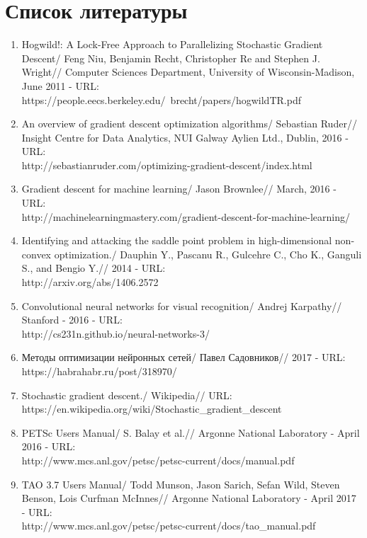 \documentclass[12pt]{report}
\begin{document}
  \chapter{Список литературы}
  \begin{enumerate}
    \item
    Hogwild!: A Lock-Free Approach to Parallelizing Stochastic Gradient Descent/
    Feng Niu, Benjamin Recht, Christopher Re and Stephen J. Wright//
    Computer Sciences Department, University of Wisconsin-Madison, June 2011 - URL:\\
    https://people.eecs.berkeley.edu/~brecht/papers/hogwildTR.pdf
    \item
    An overview of gradient descent optimization algorithms/
    Sebastian Ruder//
    Insight Centre for Data Analytics, NUI Galway Aylien Ltd., Dublin, 2016 - URL:\\
    http://sebastianruder.com/optimizing-gradient-descent/index.html
    \item
    Gradient descent for machine learning/
    Jason Brownlee//
    March, 2016 - URL:\\
    http://machinelearningmastery.com/gradient-descent-for-machine-learning/
    \item
    Identifying and attacking the saddle point problem in high-dimensional
    non-convex optimization./
    Dauphin Y., Pascanu R., Gulcehre C., Cho K., Ganguli S., and Bengio Y.//
    2014 - URL:\\
    http://arxiv.org/abs/1406.2572
    \item
    Convolutional neural networks for visual recognition/
    Andrej Karpathy//
    Stanford - 2016 - URL:\\
    http://cs231n.github.io/neural-networks-3/
    \item
    Методы оптимизации нейронных сетей/
    Павел Садовников//
    2017 - URL:\\
    https://habrahabr.ru/post/318970/
    \item
    Stochastic gradient descent./
    Wikipedia//
    URL:\\
    https://en.wikipedia.org/wiki/Stochastic\_gradient\_descent
    \item
    PETSc Users Manual/
    S. Balay et al.//
    Argonne National Laboratory - April 2016 - URL:\\
    http://www.mcs.anl.gov/petsc/petsc-current/docs/manual.pdf
    \item
    TAO 3.7 Users Manual/
    Todd Munson, Jason Sarich, Sefan Wild, Steven Benson, Lois Curfman McInnes//
    Argonne National Laboratory - April 2017 - URL:\\
    http://www.mcs.anl.gov/petsc/petsc-current/docs/tao\_manual.pdf
  \end{enumerate}
\end{document}
